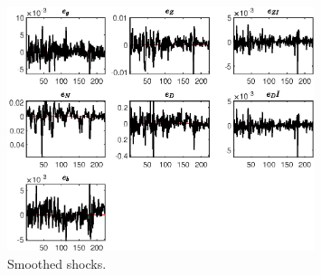  
\begin{figure}[H]
\centering 
\includegraphics[width=0.80\textwidth]{BRS_gen/graphs/BRS_gen_SmoothedShocks1}
\caption{Smoothed shocks.}\label{Fig:SmoothedShocks:1}
\end{figure}


